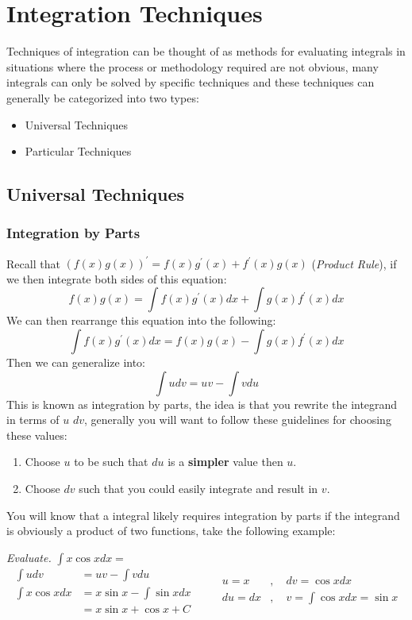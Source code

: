 \documentclass[a4paper]{article}
\begin{document}
  \section{Integration Techniques} 
  Techniques of integration can be thought of as methods for evaluating integrals in situations where the process or methodology required are not obvious, many integrals can only be solved by specific techniques and these techniques can generally be categorized into two types:
  \begin{itemize}
    \item Universal Techniques
    \item Particular Techniques
  \end{itemize}
  \subsection{Universal Techniques}
  \subsubsection{Integration by Parts}
  Recall that $(f(x)g(x))^\prime = f(x)g^\prime(x) + f^\prime(x)g(x)$ (\textit{Product Rule}), if we then integrate both sides of this equation:
  \[
    f(x)g(x) = \int f(x)g^\prime(x) dx + \int g(x)f^\prime(x) dx
  \]
  We can then rearrange this equation into the following:
  \[
    \int f(x)g^\prime(x) dx = f(x)g(x) - \int g(x)f^\prime(x) dx
  \]
  Then we can generalize into:
  \[
    \int u dv = uv - \int v du
  \]
  This is known as integration by parts, the idea is that you rewrite the integrand in terms of $u$ $dv$, generally you will want to follow these guidelines for choosing these values:
  \begin{enumerate}
    \item Choose $u$ to be such that $du$ is a \textbf{simpler} value then $u$.
    \item Choose $dv$ such that you could easily integrate and result in $v$.
  \end{enumerate}
  You will know that a integral likely requires integration by parts if the integrand is obviously a product of two functions, take the following example:

  \textit{Evaluate.} $\int x \cos x dx = $
  \begin{equation*}
    \begin{aligned}
      \int u dv &= uv - \int vdu \\
      \int x \cos x dx &= x \sin x - \int \sin x dx \\
                       &= x \sin x + \cos x + C
    \end{aligned}
    \qquad 
    \begin{aligned} 
      u = x &,\quad dv = \cos x dx \\
      du = dx &,\quad v = \int \cos x dx = \sin x
    \end{aligned}
  \end{equation*}
\end{document}
